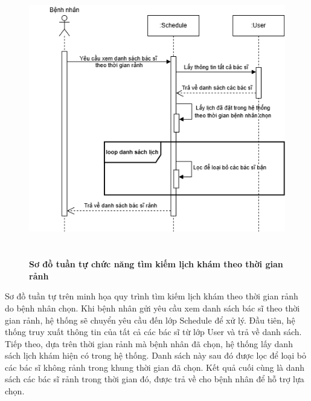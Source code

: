 \begin{figure}[H]
	\centering
	\includegraphics[width=12.5cm,height=12cm]{Images/sequence/schedule/getAvailableWithTime.drawio.png}
	\caption[Sơ đồ tuần tự chức năng tìm kiếm lịch khám theo thời gian rảnh]{\bfseries \fontsize{12pt}{0pt}
		\selectfont Sơ đồ tuần tự chức năng tìm kiếm lịch khám theo thời gian rảnh}
	\label{sequence_by_time} %
\end{figure}
Sơ đồ tuần tự trên minh họa quy trình tìm kiếm lịch khám theo thời gian rảnh do bệnh nhân chọn. Khi bệnh nhân gửi yêu cầu xem danh sách bác sĩ theo thời gian rảnh, hệ thống sẽ chuyển yêu cầu đến lớp Schedule để xử lý.
Đầu tiên, hệ thống truy xuất thông tin của tất cả các bác sĩ từ lớp User và trả về danh sách. Tiếp theo, dựa trên thời gian rảnh mà bệnh nhân đã chọn, hệ thống lấy danh sách lịch khám hiện có trong hệ thống.
Danh sách này sau đó được lọc để loại bỏ các bác sĩ không rảnh trong khung thời gian đã chọn. Kết quả cuối cùng là danh sách các bác sĩ rảnh trong thời gian đó, được trả về cho bệnh nhân để hỗ trợ lựa chọn.

